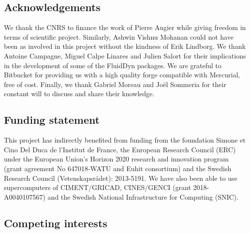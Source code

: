 \subsection{Acknowledgements}


We thank the CNRS to finance the work of Pierre Augier while giving freedom in
terms of scientific project.
%
Similarly, Ashwin Vishnu Mohanan could not have been as involved in this
project without the kindness of Erik Lindborg.
%
We thank Antoine Campagne, Miguel Calpe Linares and Julien Salort for their
implications in the development of some of the FluidDyn packages.
%
We are grateful to Bitbucket for providing us with a high quality forge
compatible with Mercurial, free of cost.
%
Finally, we thank Gabriel Moreau and Jo\"el Sommeria for their constant will
to discuss and share their knowledge.

\subsection{Funding statement}


This project has indirectly benefited from funding from the foundation Simone et
Cino Del Duca de l'Institut de France, the European Research Council (ERC)
under the European Union's Horizon 2020 research and innovation program (grant
agreement No 647018-WATU and Euhit consortium) and the Swedish Research Council
(Vetenskapsr{\aa}det): 2013-5191.
%
We have also been able to use supercomputers of CIMENT/GRICAD, CINES/GENCI
(grant 2018-A0040107567) and the Swedish National Infrastructure for Computing
(SNIC).

\subsection{Competing interests}


